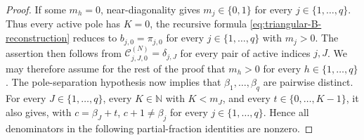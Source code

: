\documentclass[10pt]{amsart}
\theoremstyle{plain}
\theoremstyle{definition}
\theoremstyle{remark}
\begin{document}
\begin{proof}
If some \(m_h=0\), near-diagonality gives
\(m_j\in\{0,1\}\) for every \(j\in\{1,\ldots,q\}\). Thus every active
pole has \(K=0\), the recursive formula
\eqref{eq:triangular-B-reconstruction} reduces to
\(b_{j,0}=\pi_{j,0}\) for every \(j\in\{1,\ldots,q\}\) with \(m_j>0\).
The assertion then follows from
\(\mathcal C_{j,J,0}^{(N)}=\delta_{j,J}\) for every pair of active
indices \(j,J\). We may therefore assume for the rest of the proof that
\(m_h>0\) for every \(h\in\{1,\ldots,q\}\).
The pole-separation hypothesis now implies that
\(\beta_1,\ldots,\beta_q\) are pairwise distinct. For every
\(J\in\{1,\ldots,q\}\), every \(K\in\mathbb N\) with \(K<m_J\), and every
\(t\in\{0,\ldots,K-1\}\), it also gives, with \(c=\beta_J+t\),
\(c+1\ne\beta_j\) for every \(j\in\{1,\ldots,q\}\). Hence all
denominators in the following partial-fraction identities are nonzero.


\end{proof}
\end{document}
